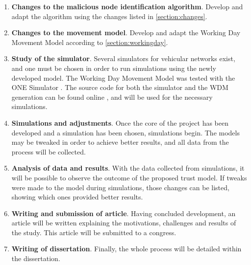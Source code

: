\begin{enumerate}
	\item \textbf{Changes to the malicious node identification algorithm}. Develop and adapt the algorithm using the changes listed in \autoref{section:changes}.
	\item \textbf{Changes to the movement model}. Develop and adapt the Working Day Movement Model according to \autoref{section:workingday}.
	\item \textbf{Study of the simulator}. Several simulators for vehicular networks exist, and one must be chosen in order to run simulations using the newly developed model. The Working Day Movement Model was tested with the ONE Simulator \cite{keranen2009one}. The source code for both the simulator and the WDM generation can be found online \cite{onerepo}, and will be used for the necessary simulations. 
	\item \textbf{Simulations and adjustments}. Once the core of the project has been developed and a simulation has been chosen, simulations begin. The models may be tweaked in order to achieve better results, and all data from the process will be collected.
	\item \textbf{Analysis of data and results}. With the data collected from simulations, it will be possible to observe the outcome of the proposed trust model. If tweaks were made to the model during simulations, those changes can be listed, showing which ones provided better results.
	\item \textbf{Writing and submission of article}. Having concluded development, an article will be written explaining the motivations, challenges and results of the study. This article will be submitted to a congress.
	\item \textbf{Writing of dissertation}. Finally, the whole process will be detailed within the dissertation.
\end{enumerate}

